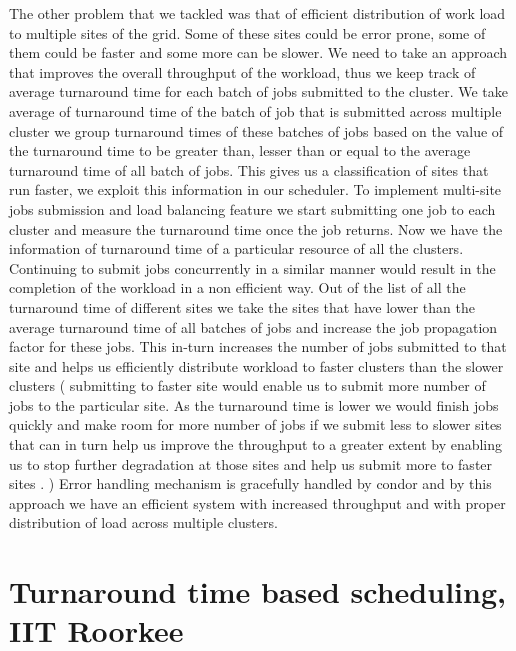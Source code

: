 \documentclass[ms,electronic,double]{nuthesis}
\begin{document}
    
The other problem that we tackled was that of efficient distribution of work load to multiple sites of the 
grid.
Some of these sites could be error prone, some of them could be faster and some more can be slower. We need to
take an approach that improves the overall throughput of the workload, thus we keep track of average turnaround
 time for each batch of jobs submitted to the cluster. We take average of turnaround time of the batch of job that is submitted 
 across multiple cluster we group turnaround times of these batches of jobs based on the value of the 
 turnaround time to be greater than, lesser than or equal to the average turnaround time of all batch of jobs.
 This gives us a classification of sites that run faster, we exploit this information in our scheduler. 
 To implement multi-site jobs submission and load balancing feature we start submitting one job to each cluster 
 and measure the turnaround time once the job returns. Now we have the information of turnaround time 
 of a particular resource of all the clusters. Continuing to submit jobs concurrently in a similar manner
  would result in the completion of
 the workload in a non efficient way. Out of the list of all the turnaround time of different sites we take the 
 sites
 that have lower than the average turnaround time of all batches of jobs and increase the job propagation 
 factor for these jobs. This in-turn increases the number of jobs submitted to that site and helps us efficiently distribute 
 workload to faster clusters than the slower clusters ( submitting to faster site would enable us to submit 
 more
  number of jobs to the particular site. As the turnaround time is lower we would finish jobs quickly and make room for more number 
  of jobs if we submit less to slower sites that can in turn help us improve the throughput to a greater extent by enabling us to stop
  further degradation at those sites and help us submit more to faster sites .
  ) 
  Error handling mechanism is gracefully handled by 
 condor and by this approach we have an efficient system with increased throughput and with proper distribution
  of load across multiple clusters.  
        
 
 
 
 



\section{Turnaround time based scheduling, IIT Roorkee}
\end{document}
